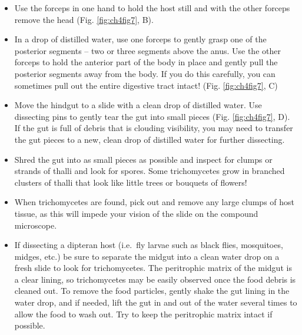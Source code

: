 \documentclass[]{book}
\providecommand{\tightlist}{%
  \setlength{\itemsep}{0pt}\setlength{\parskip}{0pt}}
\begin{document}
\begin{itemize}
\tightlist
\item
  Use the forceps in one hand to hold the host still and with the other forceps remove the head (Fig. \ref{fig:ch4fig7}, B).
\item
  In a drop of distilled water, use one forceps to gently grasp one of the posterior segments -- two or three segments above the anus. Use the other forceps to hold the anterior part of the body in place and gently pull the posterior segments away from the body. If you do this carefully, you can sometimes pull out the entire digestive tract intact! (Fig. \ref{fig:ch4fig7}, C)
\item
  Move the hindgut to a slide with a clean drop of distilled water. Use dissecting pins to gently tear the gut into small pieces (Fig. \ref{fig:ch4fig7}, D). If the gut is full of debris that is clouding visibility, you may need to transfer the gut pieces to a new, clean drop of distilled water for further dissecting.
\item
  Shred the gut into as small pieces as possible and inspect for clumps or strands of thalli and look for spores. Some trichomycetes grow in branched clusters of thalli that look like little trees or bouquets of flowers!
\item
  When trichomycetes are found, pick out and remove any large clumps of host tissue, as this will impede your vision of the slide on the compound microscope.
\item
  If dissecting a dipteran host (i.e.~fly larvae such as black flies, mosquitoes, midges, etc.) be sure to separate the midgut into a clean water drop on a fresh slide to look for trichomycetes. The peritrophic matrix of the midgut is a clear lining, so trichomycetes may be easily observed once the food debris is cleaned out. To remove the food particles, gently shake the gut lining in the water drop, and if needed, lift the gut in and out of the water several times to allow the food to wash out. Try to keep the peritrophic matrix intact if possible.
\end{itemize}
\end{document}
